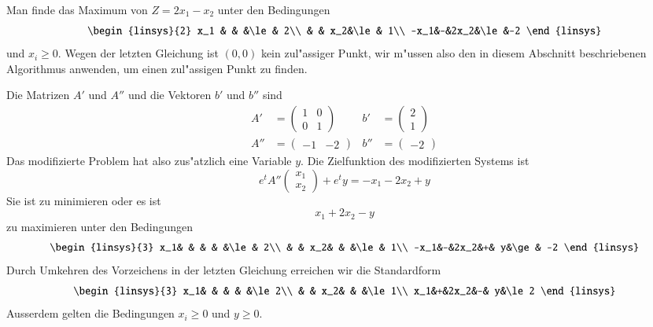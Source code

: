 \begin{beispiel}
Man finde das Maximum von $Z=2x_1-x_2$ unter den Bedingungen
\begin{equation}
\begin{linsys}{2}
x_1 & &    &\le& 2\\
    & & x_2&\le& 1\\
-x_1&-&2x_2&\le&-2
\end{linsys}
\end{equation}
und $x_i\ge 0$.
Wegen der letzten Gleichung ist $(0,0)$ kein zul"assiger Punkt, 
wir m"ussen also den in diesem Abschnitt beschriebenen Algorithmus
anwenden, um einen zul"assigen Punkt zu finden.

Die Matrizen $A'$ und $A''$ und die Vektoren $b'$ und $b''$  sind 
\begin{align*}
A'&=\begin{pmatrix}
1&0\\
0&1
\end{pmatrix}
&
b'&=\begin{pmatrix}
2\\1
\end{pmatrix}
\\
A''&=\begin{pmatrix}
-1&-2
\end{pmatrix}
&
b''&=
\begin{pmatrix}-2\end{pmatrix}
\end{align*}
Das modifizierte Problem hat also zus"atzlich eine Variable $y$.
Die Zielfunktion des modifizierten Systems ist
\[
e^t A''\begin{pmatrix}x_1\\x_2\end{pmatrix}
+
e^t y
=-x_1-2x_2+y
\]
Sie ist zu minimieren oder es ist
\[
x_1+2x_2-y
\]
zu maximieren unter den Bedingungen
\[
\begin{linsys}{3}
 x_1& &    & &   &\le& 2\\
    & & x_2& &   &\le& 1\\
-x_1&-&2x_2&+&  y&\ge& -2
\end{linsys}
\]
Durch Umkehren des Vorzeichens in der letzten Gleichung erreichen
wir die Standardform
\begin{equation}
\begin{linsys}{3}
 x_1& &    & &   &\le 2\\
    & & x_2& &   &\le 1\\
 x_1&+&2x_2&-&  y&\le 2
\end{linsys}
\end{equation}
Ausserdem gelten die Bedingungen $x_i\ge 0$ und $y\ge 0$. 


\end{beispiel}
